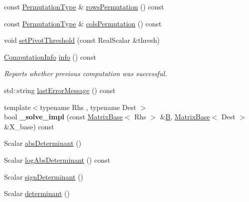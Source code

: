 \begin{DoxyCompactItemize}
const \hyperlink{group___core___module}{Permutation\+Type} \& \hyperlink{group___sparse_l_u___module_a691295e65c06df599876d78ac2c7fada}{rows\+Permutation} () const
\item 
const \hyperlink{group___core___module}{Permutation\+Type} \& \hyperlink{group___sparse_l_u___module_ab7b0d15d0d9fd1faa164298f92ca59cd}{cols\+Permutation} () const
\item 
void \hyperlink{group___sparse_l_u___module_a94c726c9ebb71a60b529fe47d942ad57}{set\+Pivot\+Threshold} (const Real\+Scalar \&thresh)
\item 
\hyperlink{group__enums_ga85fad7b87587764e5cf6b513a9e0ee5e}{Computation\+Info} \hyperlink{group___sparse_l_u___module_ab0d0c1744ffd5a1dff578a44bcef2a3d}{info} () const
\begin{DoxyCompactList}\small\item\em Reports whether previous computation was successful. \end{DoxyCompactList}\item 
std\+::string \hyperlink{group___sparse_l_u___module_a5458c4e851d7d75c8ca92c4fd02d2adb}{last\+Error\+Message} () const
\item 
\mbox{\label{group___sparse_l_u___module_aca57d33f0acf9d0d4fcf85c715b73cc6}} 
{\footnotesize template$<$typename Rhs , typename Dest $>$ }\\bool {\bfseries \+\_\+solve\+\_\+impl} (const \hyperlink{group___core___module_class_eigen_1_1_matrix_base}{Matrix\+Base}$<$ Rhs $>$ \&\hyperlink{group___core___module_class_eigen_1_1_matrix}{B}, \hyperlink{group___core___module_class_eigen_1_1_matrix_base}{Matrix\+Base}$<$ Dest $>$ \&X\+\_\+base) const
\item 
Scalar \hyperlink{group___sparse_l_u___module_a06fa89424239fb169d408f08252426d0}{abs\+Determinant} ()
\item 
Scalar \hyperlink{group___sparse_l_u___module_a89e30a7df205596784a5a73f4768eaec}{log\+Abs\+Determinant} () const
\item 
Scalar \hyperlink{group___sparse_l_u___module_a6651143e3b18fa90cfb3808b6fd23c4e}{sign\+Determinant} ()
\item 
Scalar \hyperlink{group___sparse_l_u___module_a02d63d242d27211b5c5827f5d4fd99ff}{determinant} ()
\end{DoxyCompactItemize}
